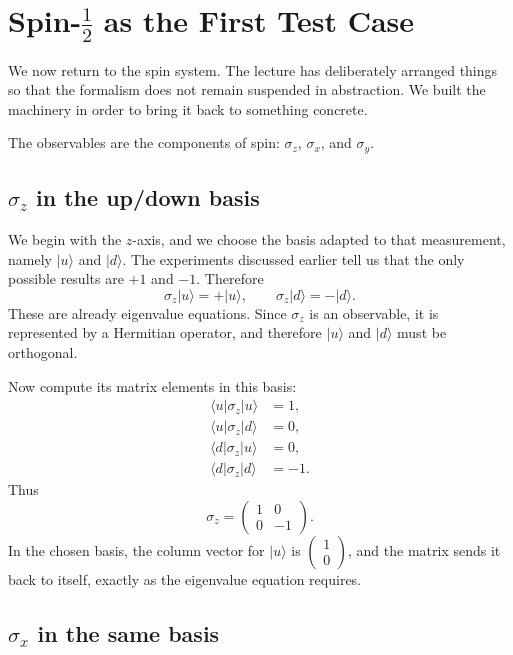 \section{Spin-\(\frac{1}{2}\) as the First Test Case}

We now return to the spin system. The lecture has deliberately arranged things so that the formalism does not remain suspended in abstraction. We built the machinery in order to bring it back to something concrete.

The observables are the components of spin:
\(\sigma_z\), \(\sigma_x\), and \(\sigma_y\).

\subsection{\(\sigma_z\) in the up/down basis}

We begin with the \(z\)-axis, and we choose the basis adapted to that measurement, namely \(|u\rangle\) and \(|d\rangle\). The experiments discussed earlier tell us that the only possible results are \(+1\) and \(-1\). Therefore
\begin{equation}
\sigma_z|u\rangle=+|u\rangle,
\qquad
\sigma_z|d\rangle=-|d\rangle.
\end{equation}
These are already eigenvalue equations. Since \(\sigma_z\) is an observable, it is represented by a Hermitian operator, and therefore \(|u\rangle\) and \(|d\rangle\) must be orthogonal.

Now compute its matrix elements in this basis:
\begin{align}
\langle u|\sigma_z|u\rangle &= 1, \\
\langle u|\sigma_z|d\rangle &= 0, \\
\langle d|\sigma_z|u\rangle &= 0, \\
\langle d|\sigma_z|d\rangle &= -1.
\end{align}
Thus
\begin{equation}
\sigma_z=
\begin{pmatrix}
1 & 0 \\
0 & -1
\end{pmatrix}.
\end{equation}
In the chosen basis, the column vector for \(|u\rangle\) is \(\begin{pmatrix}1\\0\end{pmatrix}\), and the matrix sends it back to itself, exactly as the eigenvalue equation requires.

\subsection{\(\sigma_x\) in the same basis}

